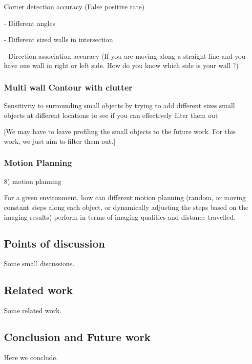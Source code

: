   Corner detection accuracy (False positive rate)
   
  - Different angles
 
  - Different sized walls in intersection
  
  - Direction association accuracy (If you are moving along a straight line and you have one wall in right or left side. How do you know which side is your wall ?)
  
\subsubsection{Multi wall Contour with clutter}

Sensitivity to surrounding small objects by trying to add different sizes small objects at different locations to see if you can effectively filter them out 

[We may have to leave profiling the small objects to the future work. For this work, we just aim to filter them out.]

\subsubsection{Motion Planning}
8) motion planning 

For a given environment, how can different motion planning (random, or moving constant steps along each object, or dynamically adjusting the steps based on the imaging results) perform in terms of imaging qualities and distance travelled.


\subsection{Points of discussion}
Some small discussions.

\subsection{Related work}
Some related work.

\subsection{Conclusion and Future work}
Here we conclude.



